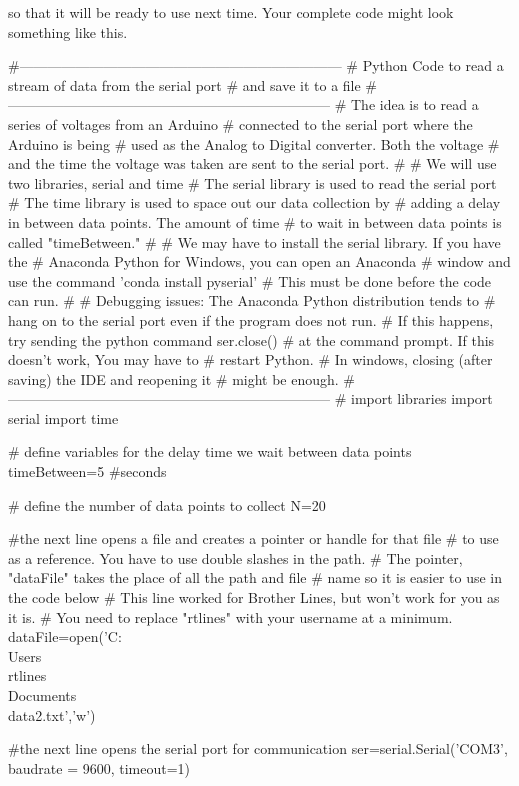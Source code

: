 so that it will be ready to use next time. Your complete code might look
something like this.
\begin{python}
#---------------------------------------------------------------------
# Python Code to read a stream of data from the serial port
#   and save it to a file
#---------------------------------------------------------------------
#   The idea is to read a series of voltages from an Arduino 
#   connected to the serial port where the Arduino is being 
#   used as the Analog to Digital converter. Both the voltage
#   and the time the voltage was taken are sent to the serial port.
#
# We will use two libraries, serial and time
#   The serial library is used to read the serial port
#   The time library is used to space out our data collection by
#   adding a delay in between data points. The amount of time 
#   to wait in between data points is called "timeBetween." 
#
# We may have to install the serial library. If you have the
#   Anaconda Python for Windows, you can open an Anaconda 
#   window and use the command 'conda install pyserial'
#   This must be done before the code can run.
#
# Debugging issues:  The Anaconda Python distribution tends to 
#   hang on to the serial port even if the program does not run. 
#   If this happens, try sending the python command ser.close()
#   at the command prompt. If this doesn't work, You may have to 
#   restart Python.
#   In windows, closing (after saving) the IDE and reopening it 
#   might be enough.
#---------------------------------------------------------------------
# import libraries
import serial
import time
 
# define variables for the delay time we wait between data points
timeBetween=5 #seconds
 
# define the number of data points to collect
N=20
 
#the next line opens a file and creates a pointer or handle for that file
#  to use as a reference. You have to use double slashes in the path.
#  The pointer, "dataFile" takes the place of all the path and file
#  name so it is easier to use in the code below
#  This line worked for Brother Lines, but won't work for you as it is.
#  You need to replace "rtlines" with your username at a minimum.
dataFile=open('C:\\Users\\rtlines\\Documents\\data2.txt','w')
 
#the next line opens the serial port for communication
ser=serial.Serial('COM3', baudrate = 9600, timeout=1)
 

\end{python}
